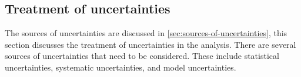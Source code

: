 \subsection{Treatment of uncertainties}
\label{sec:treatment_of_uncertainties}
The sources of uncertainties are discussed in \cref{sec:sources-of-uncertainties}, this section discusses the treatment of uncertainties in the analysis. There are several sources of uncertainties that need to be considered. These include statistical uncertainties, systematic uncertainties, and model uncertainties.
